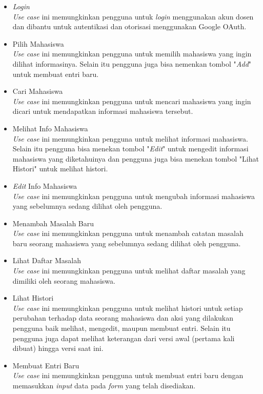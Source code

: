 \begin{itemize}
\item {\it Login}\\
{\it Use case} ini memungkinkan pengguna untuk {\it login} menggunakan akun dosen dan dibantu untuk autentikasi dan otorisasi menggunakan Google OAuth.
\item Pilih Mahasiswa\\
{\it Use case} ini memungkinkan pengguna untuk memilih mahasiswa yang ingin dilihat informasinya. Selain itu pengguna juga bisa nemenkan tombol "{\it Add}" untuk membuat entri baru.
\item Cari Mahasiswa\\
{\it Use case} ini memungkinkan pengguna untuk mencari mahasiswa yang ingin dicari untuk mendapatkan informasi mahasiswa tersebut.
\item Melihat Info Mahasiswa\\
{\it Use case} ini memungkinkan pengguna untuk melihat informasi mahasiswa. Selain itu pengguna bisa menekan tombol "{\it Edit}" untuk mengedit informasi mahasiswa yang diketahuinya dan pengguna juga bisa menekan tombol "Lihat Histori" untuk melihat histori.
\item {\it Edit} Info Mahasiswa\\
{\it Use case} ini memungkinkan pengguna untuk mengubah informasi mahasiswa yang sebelumnya sedang dilihat oleh pengguna.
\item Menambah Masalah Baru\\
{\it Use case} ini memungkinkan pengguna untuk menambah catatan masalah baru seorang mahasiswa yang sebelumnya sedang dilihat oleh pengguna.
\item Lihat Daftar Masalah\\
{\it Use case} ini memungkinkan pengguna untuk melihat daftar masalah yang dimiliki oleh seorang mahasiswa.
\item Lihat Histori\\
{\it Use case} ini memungkinkan pengguna untuk melihat histori untuk setiap perubahan terhadap data seorang mahasiswa dan aksi yang dilakukan pengguna baik melihat, mengedit, maupun membuat entri. Selain itu pengguna juga dapat melihat keterangan dari versi awal (pertama kali dibuat) hingga versi saat ini.
\item Membuat Entri Baru\\
{\it Use case} ini memungkinkan pengguna untuk membuat entri baru dengan memasukkan {\it input} data pada {\it form} yang telah disediakan.
\end{itemize}

